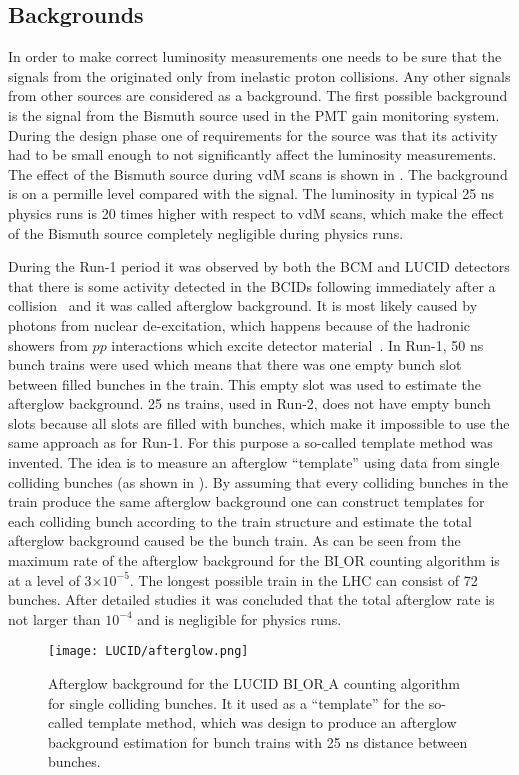 \subsection{Backgrounds}
\label{subsec:backgrounds}
In order to make correct luminosity measurements one needs to be sure that the signals from the originated only from inelastic proton collisions.
Any other signals from other sources are considered as a background.
The first possible background is the signal from the Bismuth source used in the PMT gain monitoring system.
During the design phase one of requirements for the source was that its activity had to be small enough to not significantly affect the luminosity measurements.
The effect of the Bismuth source during vdM scans is shown in . The background is on a permille level compared with the signal.
The luminosity in typical 25 ns physics runs is 20 times higher with respect to vdM scans, which make the effect of the Bismuth source completely negligible during physics runs. 

During the Run-1 period it was observed by both the BCM and LUCID detectors that there is some activity detected in the BCIDs following immediately after a collision~\cite{Aad:2011dr,Aad:2013ucp}
and it was called afterglow background. It is most likely caused by photons from nuclear de-excitation, which happens because of the hadronic showers from $pp$ interactions which excite detector material~\cite{Aaboud:2016hhf}.
In Run-1, 50 ns bunch trains were used which means that there was one empty bunch slot between filled bunches in the train.
This empty slot was used to estimate the afterglow background.
25 ns trains, used in Run-2, does not have empty bunch slots because all slots are filled with bunches, which make it impossible to use the same approach as for Run-1.
For this purpose a so-called template method was invented. The idea is to measure an afterglow ``template'' using data from single colliding bunches (as shown in ).
By assuming that every colliding bunches in the train produce the same afterglow background one can construct templates for each colliding bunch according to the train structure and estimate the total afterglow background caused be the bunch train. 
As can be seen from  the maximum rate of the afterglow background for the BI$\_$OR counting algorithm is at a level of 3$\times10^{-5}$. 
The longest possible train in the LHC can consist of 72 bunches. 
After detailed studies it was concluded that the total afterglow rate is not larger than $10^{-4}$ and is negligible for physics runs.
\begin{figure}
\centering
\texttt{[image: LUCID/afterglow.png]}
\caption{Afterglow background for the LUCID BI$\_$OR$\_$A counting algorithm for single colliding bunches. 
It it used as a ``template'' for the so-called template method, which was design
to produce an afterglow background estimation for bunch trains with 25 ns distance between bunches.}
\label{fig:afterglow}
\end{figure}

